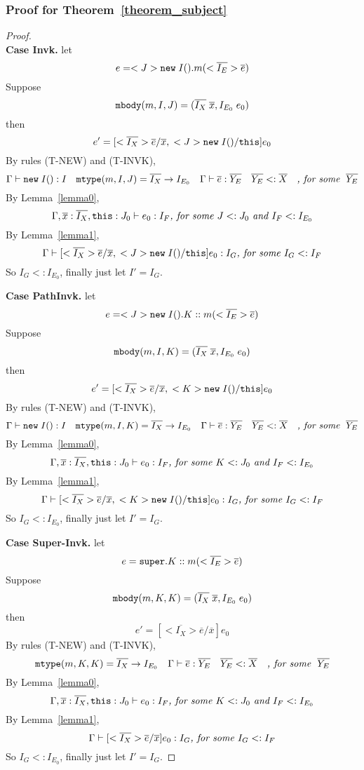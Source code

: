 \subsubsection{Proof for Theorem~\ref{theorem_subject}}
\begin{proof} ~\\
\noindent \textbf{Case Invk.} 
let \[ e = <J>\texttt{new} \; I().m(<\overline{I_E}>\overline{e}) \] 
Suppose \[ \texttt{mbody}(m, I, J) = (\overline{I_X} \; \overline{x}, I_{E_0} \; e_0) \] 
then \[ e' =  [<\overline{I_X}>\overline{e}/\overline{x}, \; <J>\texttt{new} \; I()/\texttt{this} ] e_0 \] 
By rules (T-NEW) and (T-INVK), 
  \[ \Gamma \; {\vdash} \; \texttt{new} \; I():I \quad 
     \texttt{mtype}(m, I, J) = \overline{I_X} \rightarrow I_{E_0} \quad 
     \Gamma \; {\vdash} \; \overline{e} : \overline{Y_E} \quad
     \overline{Y_E} <: \overline{X} \quad
     \textit{, for some } \; \overline{Y_E}
  \]
By Lemma~\ref{lemma0},
    \[
    \Gamma, \overline{x}:\overline{I_X}, \texttt{this}:J_0 \; {\vdash} \; e_0:I_F \textit{, for some } J <: J_0 \textit{ and } I_F <: I_{E_0}
    \]
By Lemma~\ref{lemma1},
    \[
    \Gamma \; {\vdash} \; [<\overline{I_X}>\overline{e}/\overline{x}, \; <J>\texttt{new} \; I()/\texttt{this} ] e_0  :  I_G \textit{, for some } I_G <: I_F 
    \]
So $I_G <: I_{E_0}$, finally just let $I' = I_G$.

\noindent \textbf{Case PathInvk.}
let \[ e = <J>\texttt{new} \; I().K::m(<\overline{I_E}>\overline{e}) \]  
Suppose \[ \texttt{mbody}(m, I, K) = (\overline{I_X} \; \overline{x}, I_{E_0} \; e_0) \] 
then \[ e' =  [<\overline{I_X}>\overline{e}/\overline{x}, \; <K>\texttt{new} \; I()/\texttt{this} ] e_0 \] 
By rules (T-NEW) and (T-INVK), 
  \[ \Gamma \; {\vdash} \; \texttt{new} \; I():I \quad 
     \texttt{mtype}(m, I, K) = \overline{I_X} \rightarrow I_{E_0} \quad 
     \Gamma \; {\vdash} \; \overline{e} : \overline{Y_E} \quad
     \overline{Y_E} <: \overline{X} \quad
     \textit{, for some } \; \overline{Y_E}
  \]
By Lemma~\ref{lemma0},
    \[
    \Gamma, \overline{x}:\overline{I_X}, \texttt{this}:J_0 \; {\vdash} \; e_0:I_F \textit{, for some } K <: J_0 \textit{ and } I_F <: I_{E_0}
    \]
By Lemma~\ref{lemma1},
    \[
    \Gamma \; {\vdash} \; [<\overline{I_X}>\overline{e}/\overline{x}, \; <K>\texttt{new} \; I()/\texttt{this} ] e_0  :  I_G \textit{, for some } I_G <: I_F 
    \]
So $I_G <: I_{E_0}$, finally just let $I' = I_G$.

\noindent \textbf{Case Super-Invk.}
let \[ e = \texttt{super}.K::m(<\overline{I_E}>\overline{e}) \]   
Suppose \[ \texttt{mbody}(m, K, K) = (\overline{I_X} \; \overline{x}, I_{E_0} \; e_0) \] 
then \[ e' =  [<\overline{I_X}>\overline{e}/\overline{x}] e_0 \] 
By rules (T-NEW) and (T-INVK), 
  \[ 
     \texttt{mtype}(m, K, K) = \overline{I_X} \rightarrow I_{E_0} \quad 
     \Gamma \; {\vdash} \; \overline{e} : \overline{Y_E} \quad
     \overline{Y_E} <: \overline{X} \quad
     \textit{, for some } \; \overline{Y_E}
  \]
By Lemma~\ref{lemma0},
    \[
    \Gamma, \overline{x}:\overline{I_X}, \texttt{this}:J_0 \; {\vdash} \; e_0:I_F \textit{, for some } K <: J_0 \textit{ and } I_F <: I_{E_0}
    \]
By Lemma~\ref{lemma1},
    \[
    \Gamma \; {\vdash} \; [<\overline{I_X}>\overline{e}/\overline{x} ] e_0  :  I_G \textit{, for some } I_G <: I_F 
    \]
So $I_G <: I_{E_0}$, finally just let $I' = I_G$.

\end{proof}

